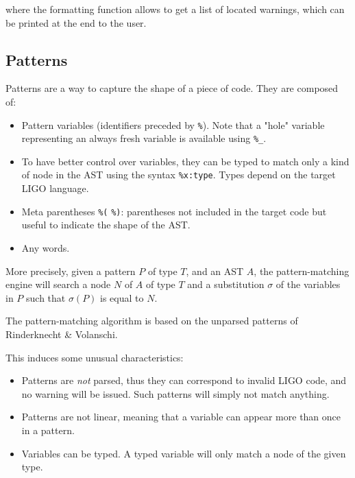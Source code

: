 \documentclass[10pt,a4paper]{article}
\begin{document}
where the formatting function allows to get a list of located
warnings, which can be printed at the end to the user.

\subsection{Patterns}
Patterns are a way to capture the shape of a piece of code. They are
composed of:

\begin{itemize}
\item
  Pattern variables (identifiers preceded by \verb|%|). Note that a
  "hole" variable representing an always fresh variable is available
  using \verb|%_|.

\item
  To have better control over variables, they can be typed to match
  only a kind of node in the AST using the syntax
  \verb|%x:type|. Types depend on the target LIGO language.

\item
  Meta parentheses \verb|%(| \verb|%)|: parentheses not included in
  the target code but useful to indicate the shape of the AST.

\item
  Any words.
\end{itemize}


More precisely, given a pattern $P$ of type $T$, and an AST $A$, the
pattern-matching engine will search a node $N$ of $A$ of type $T$ and
a substitution $\sigma$ of the variables in $P$ such that $\sigma(P)$
is equal to $N$.

The pattern-matching algorithm is based on the unparsed patterns of
Rinderknecht \& Volanschi\cite{unparsedpatterns}.

This induces some unusual characteristics:
\begin{itemize}
\item
  Patterns are \emph{not} parsed, thus they can correspond to invalid
  LIGO code, and no warning will be issued. Such patterns will simply
  not match anything.

\item
  Patterns are not linear, meaning that a variable can appear more
  than once in a pattern.

\item
  Variables can be typed. A typed variable will only match a node of
  the given type.
\end{itemize}
\end{document}
